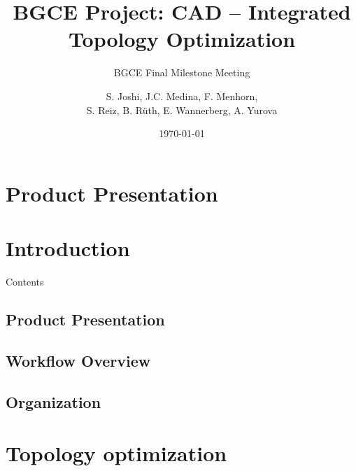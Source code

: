 \documentclass[9pt,pdftex]{beamer}
\title{BGCE Project: CAD -- Integrated Topology Optimization}
\subtitle{BGCE Final Milestone Meeting}
\author[S. Joshi, S. Reiz] {
S. Joshi, J.C. Medina, F. Menhorn, 
\\
S. Reiz, B. Rüth, E. Wannerberg, A. Yurova} %
\date{\today}
\institute{Technische Universität München}
\begin{document}
\frame{\maketitle}


\section{Product Presentation}


\section{Introduction}
\begin{frame}{Contents}
\tableofcontents
\end{frame}

\subsection{Product Presentation}


\subsection{Workflow Overview}


\subsection{Organization}



\section{Topology optimization}


%
\end{document}
